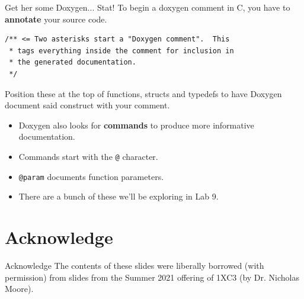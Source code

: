 \documentclass[11pt]{beamer}
\begin{document}
\begin{frame}[fragile=singleslide]{Get her some Doxygen... Stat!}
To begin a doxygen comment in C, you have to \textbf{annotate} your source code.
\begin{lstlisting}[style=C]
/** <= Two asterisks start a "Doxygen comment".  This 
 * tags everything inside the comment for inclusion in 
 * the generated documentation.
 */
\end{lstlisting}
Position these at the top of functions, structs and typedefs to have Doxygen document said construct with your comment.  
\begin{itemize}
\item Doxygen also looks for \textbf{commands} to produce more informative documentation.
\item Commands start with the \texttt{@} character. 
\item \texttt{@param} documents function parameters.  
\item There are a bunch of these we'll be exploring in Lab 9.  
\end{itemize}
\end{frame}

\section[Acknowledge]{Acknowledge}
\begin{frame}{Acknowledge}
\center
\vspace{8em}
The contents of these slides were liberally borrowed (with permission) from slides from the Summer 2021 offering of 1XC3 (by Dr. Nicholas Moore).  
\end{frame}



\end{document}
